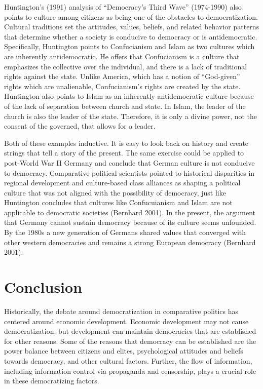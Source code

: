 \documentclass[12pt,]{article}
\begin{document}
Huntington's (1991) analysis of ``Democracy's Third Wave'' (1974-1990)
also points to culture among citizens as being one of the obstacles to
democratization. Cultural traditions set the attitudes, values, beliefs,
and related behavior patterns that determine whether a society is
conducive to democracy or is antidemocratic. Specifically, Huntington
points to Confucianism and Islam as two cultures which are inherently
antidemocratic. He offers that Confucianism is a culture that emphasizes
the collective over the individual, and there is a lack of traditional
rights against the state. Unlike America, which has a notion of
``God-given'' rights which are unalienable, Confucianism's rights are
created by the state. Huntington also points to Islam as an inherently
antidemocratic culture because of the lack of separation between church
and state. In Islam, the leader of the church is also the leader of the
state. Therefore, it is only a divine power, not the consent of the
governed, that allows for a leader.

Both of these examples inductive. It is easy to look back on history and
create strings that tell a story of the present. The same exercise could
be applied to post-World War II Germany and conclude that German culture
is not conducive to democracy. Comparative political scientists pointed
to historical disparities in regional development and culture-based
class alliances as shaping a political culture that was not aligned with
the possibility of democracy, just like Huntington concludes that
cultures like Confucuianism and Islam are not applicable to democratic
societies (Bernhard 2001). In the present, the argument that Germany
cannot sustain democracy because of its culture seems unfounded. By the
1980s a new generation of Germans shared values that converged with
other western democracies and remains a strong European democracy
(Bernhard 2001).

\hypertarget{conclusion}{%
\section{Conclusion}\label{conclusion}}

Historically, the debate around democratization in comparative politics
has centered around economic development. Economic development may not
cause democratization, but development can maintain democracies that are
established for other reasons. Some of the reasons that democracy can be
established are the power balance between citizens and elites,
psychological attitudes and beliefs towards democracy, and other
cultural factors. Further, the flow of information, including
information control via propaganda and censorship, plays a crucial role
in these democratizing factors.
\end{document}
